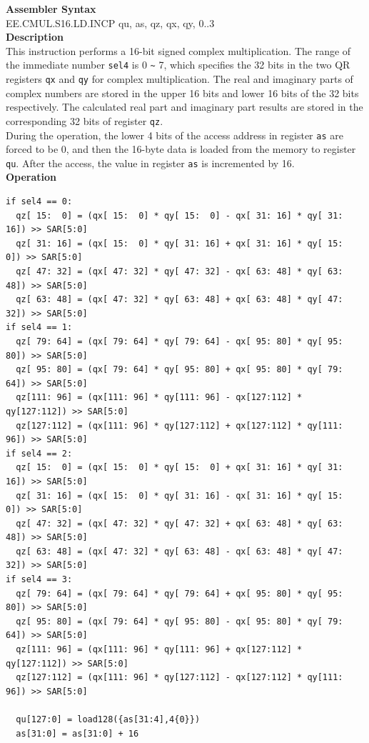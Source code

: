 \textbf{Assembler Syntax} \\
EE.CMUL.S16.LD.INCP qu, as, qz, qx, qy, 0..3 \\
\textbf{Description} \\
This instruction performs a 16-bit signed complex multiplication. The range of the immediate number \lstinline{sel4} is 0 \verb+~+ 7, which specifies the 32 bits in the two QR registers \lstinline{qx} and \lstinline{qy} for complex multiplication. The real and imaginary parts of complex numbers are stored in the upper 16 bits and lower 16 bits of the 32 bits respectively. The calculated real part and imaginary part results are stored in the corresponding 32 bits of register \lstinline{qz}.\\
During the operation, the lower 4 bits of the access address in register \lstinline{as} are forced to be 0, and then the 16-byte data is loaded from the memory to register \lstinline{qu}. After the access, the value in register \lstinline{as} is incremented by 16.\\
\textbf{Operation}
\begin{lstlisting}
if sel4 == 0:
  qz[ 15:  0] = (qx[ 15:  0] * qy[ 15:  0] - qx[ 31: 16] * qy[ 31: 16]) >> SAR[5:0]
  qz[ 31: 16] = (qx[ 15:  0] * qy[ 31: 16] + qx[ 31: 16] * qy[ 15:  0]) >> SAR[5:0]
  qz[ 47: 32] = (qx[ 47: 32] * qy[ 47: 32] - qx[ 63: 48] * qy[ 63: 48]) >> SAR[5:0]
  qz[ 63: 48] = (qx[ 47: 32] * qy[ 63: 48] + qx[ 63: 48] * qy[ 47: 32]) >> SAR[5:0]
if sel4 == 1:
  qz[ 79: 64] = (qx[ 79: 64] * qy[ 79: 64] - qx[ 95: 80] * qy[ 95: 80]) >> SAR[5:0]
  qz[ 95: 80] = (qx[ 79: 64] * qy[ 95: 80] + qx[ 95: 80] * qy[ 79: 64]) >> SAR[5:0]
  qz[111: 96] = (qx[111: 96] * qy[111: 96] - qx[127:112] * qy[127:112]) >> SAR[5:0]
  qz[127:112] = (qx[111: 96] * qy[127:112] + qx[127:112] * qy[111: 96]) >> SAR[5:0]
if sel4 == 2:
  qz[ 15:  0] = (qx[ 15:  0] * qy[ 15:  0] + qx[ 31: 16] * qy[ 31: 16]) >> SAR[5:0]
  qz[ 31: 16] = (qx[ 15:  0] * qy[ 31: 16] - qx[ 31: 16] * qy[ 15:  0]) >> SAR[5:0]
  qz[ 47: 32] = (qx[ 47: 32] * qy[ 47: 32] + qx[ 63: 48] * qy[ 63: 48]) >> SAR[5:0]
  qz[ 63: 48] = (qx[ 47: 32] * qy[ 63: 48] - qx[ 63: 48] * qy[ 47: 32]) >> SAR[5:0]
if sel4 == 3:
  qz[ 79: 64] = (qx[ 79: 64] * qy[ 79: 64] + qx[ 95: 80] * qy[ 95: 80]) >> SAR[5:0]
  qz[ 95: 80] = (qx[ 79: 64] * qy[ 95: 80] - qx[ 95: 80] * qy[ 79: 64]) >> SAR[5:0]
  qz[111: 96] = (qx[111: 96] * qy[111: 96] + qx[127:112] * qy[127:112]) >> SAR[5:0]
  qz[127:112] = (qx[111: 96] * qy[127:112] - qx[127:112] * qy[111: 96]) >> SAR[5:0]

  qu[127:0] = load128({as[31:4],4{0}})
  as[31:0] = as[31:0] + 16
\end{lstlisting}

